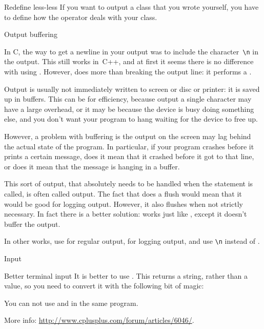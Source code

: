\begin{block}{Redefine less-less}
  \label{sl:lessless-def}
  If you want to output a class that you wrote yourself, you have to
  define how the \n{<<} operator deals with your class.

\end{block}

 {Output buffering}

In C, the way to get a newline in your output was to include the
character~\verb+\n+ in the output. This still works in~C++, and at
first it seems there is no difference with using . However,
 does more than breaking the output line: it
performs a .

Output is usually not immediately written to screen or disc or
printer: it is saved up in buffers. This can be for efficiency,
because output a single character may have a large overhead, or it may
be because the device is busy doing something else, and you don't want
your program to hang waiting for the device to free up.

However, a problem with buffering is the output on the screen may lag
behind the actual state of the program. In particular, if your program
crashes before it prints a certain message, does it mean that it
crashed before it got to that line, or does it mean that the message
is hanging in a buffer.

This sort of output, that absolutely needs to be handled when the
statement is called, is often called  output.
The fact that  does a flush would mean that it would be good
for logging output. However, it also flushes when not strictly
necessary. In fact there is a better solution:
 works just like , except it
doesn't buffer the output.

In other works, use  for regular output,  for logging
output, and use \verb+\n+ instead of .

 {Input}

\begin{block}{Better terminal input}
  \label{sl:getline}
  It is better to use . This returns a string,
  rather than a value, so you need to convert it with the following bit
  of magic:

  You can not use  and  in the same program.

  More info:
  \url{http://www.cplusplus.com/forum/articles/6046/}.

\end{block}

